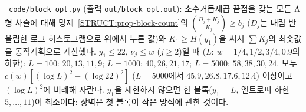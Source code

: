 \begin{remark}\label{STRUCT:rem-num-block}
\NUMERIC\ \texttt{code/block\_opt.py} (출력 \texttt{out/block\_opt.out}): 소수거듭제곱 끝점을 갖는 모든 $\Lambda$형 사슬에 대해 명제~\ref{STRUCT:prop-block-count}의 $\binom{D_j+K_j}{K_j}\ge b_j$ ($D_j$는 내림 반올림한 로그 히스토그램으로 위에서 누른 값)와 $K_1\ge H(y_1)$을 써서 $\sum K_j$의 최솟값을 동적계획으로 계산했다. $y_1\le22$, $\nu_j\le w$ ($j\ge2$)일 때 ($L$: $w=1/4,1/2,3/4,0.9$의 하한): $L=100$: $20,13,11,9$; $L=1000$: $40,26,21,17$; $L=5000$: $58,38,30,24$. 모두 $c(w)[(\log L)^2-(\log22)^2]$ ($L=5000$에서 $45.9,26.8,17.6,12.4$) 이상이고 $(\log L)^2$에 비례해 자란다. $y_1$을 제한하지 않으면 한 블록($y_1=L$, 엔트로피 하한 $5,\dots,11$)이 최소이다: 장벽은 첫 블록이 작은 방식에 관한 것이다.
\end{remark}

